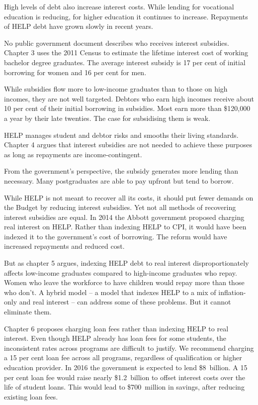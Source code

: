 \documentclass[embargoed]{grattan}
\begin{document}
High levels of debt also increase interest costs.
While lending for vocational education is reducing, for higher education it continues to increase.
Repayments of \gls{HELP} debt have grown slowly in recent years.

No public government document describes who receives interest subsidies.
Chapter 3 uses the 2011 Census to estimate the lifetime interest cost of working bachelor degree graduates.
The average interest subsidy is 17 per cent of initial borrowing for women and 16 per cent for men.

While subsidies flow more to low-income graduates than to those on high incomes, they are not well targeted.
Debtors who earn high incomes receive about 10 per cent of their initial borrowing in subsidies.
Most earn more than \$120,000 a year by their late twenties.
The case for subsidising them is weak.

\gls{HELP} manages student and debtor risks and smooths their living standards.
Chapter 4 argues that interest subsidies are not needed to achieve these purposes as long as repayments are income-contingent.

From the government's perspective, the subsidy generates more lending than necessary.
Many postgraduates are able to pay upfront but tend to borrow.

While \gls{HELP} is not meant to recover all its costs, it should put fewer demands on the Budget by reducing interest subsidies.
Yet not all methods of recovering interest subsidies are equal.
In 2014 the Abbott government proposed charging real interest on \gls{HELP}.
Rather than indexing \gls{HELP} to \gls{CPI}, it would have been indexed it to the government's cost of borrowing.
The reform would have increased repayments and reduced cost.

But as chapter 5 argues, indexing \gls{HELP} debt to real interest disproportionately affects low-income graduates compared to high-income graduates who repay.
Women who leave the workforce to have children would repay more than those who don't.
A hybrid model -- a model that indexes \gls{HELP} to a mix of inflation-only and real interest -- can address some of these problems.
But it cannot eliminate them.

Chapter 6 proposes charging loan fees rather than indexing \gls{HELP} to real interest.
Even though \gls{HELP} already has loan fees for some students, the inconsistent rates across programs are difficult to justify.
We recommend charging a 15 per cent loan fee across all programs, regardless of qualification or higher education provider.
In 2016 the government is expected to lend \$8~billion.
A 15 per cent loan fee would raise nearly \$1.2~billion to offset interest costs over the life of student loans.
This would lead to \$700~million in savings, after reducing existing loan fees.
\end{document}
